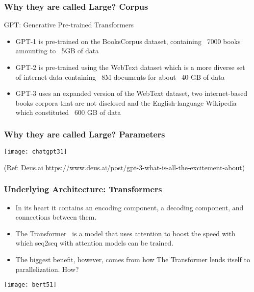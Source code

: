 \begin{frame}[fragile]\frametitle{Why they are called Large? Corpus}

GPT: Generative Pre-trained Transformers

\begin{itemize}
\item GPT-1 is pre-trained on the BooksCorpus dataset, containing ~7000 books amounting to ~5GB of data
\item GPT-2 is pre-trained using the WebText dataset which is a more diverse set of internet data containing ~8M documents for about ~40 GB of data
\item GPT-3 uses an expanded version of the WebText dataset, two internet-based books corpora that are not disclosed and the English-language Wikipedia which constituted ~600 GB of data
\end{itemize}	 

\end{frame}

\begin{frame}[fragile]\frametitle{Why they are called Large? Parameters}

\begin{center}
\texttt{[image: chatgpt31]}
\end{center}				
{\tiny (Ref: Deus.ai https://www.deus.ai/post/gpt-3-what-is-all-the-excitement-about)}

\end{frame}

\begin{frame}[fragile]\frametitle{Underlying Architecture: Transformers}


\begin{itemize}
\item In its heart it contains an encoding component, a decoding component, and connections between them.
\item The Transformer  is a model that uses attention to boost the speed with which seq2seq with attention models can be trained. 
\item The biggest benefit, however, comes from how The Transformer lends itself to parallelization. How?
\end{itemize}	 

\begin{center}
\texttt{[image: bert51]}
\end{center}	

\end{frame}

